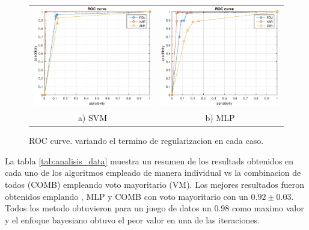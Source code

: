 \documentclass[12pt]{article}
\begin{document}
\begin{figure}[!h]
\centering
\begin{tabular}{cc}
\includegraphics[width=2.5in]{../out/svm-roc.eps}&
\includegraphics[width=2.5in]{../out/mlp-roc.eps} \\
a) SVM  & b) MLP
\end{tabular}
\caption{ROC curve. variando el termino de regularizacion en cada caso.}
\label{fig:roc_curve}
\end{figure}
 
 
 
La tabla \ref{tab:analisis_data} muestra un resumen de los resultads obtenidos en cada uno de los algoritmos empleado de manera individual vs la combinacion de todos (COMB) empleando voto mayoritario (VM). Los mejores resultados fueron obtenidos emplando , MLP y COMB con voto mayoritario con un $0.92 \pm 0.03$. Todos los metodo obtuvieron para un juego de datos un 0.98 como maximo valor y el enfoque bayesiano obtuvo el peor valor en una de las iteraciones.
 
 
\end{document}
